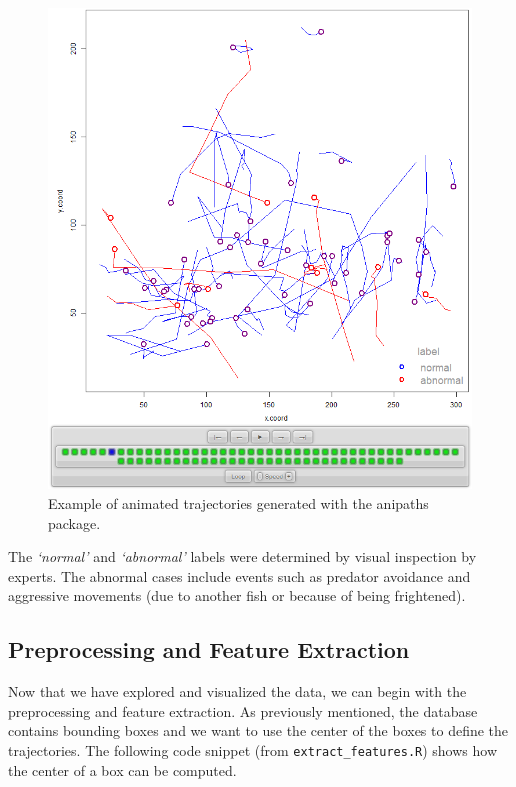 \documentclass[
  11pt,
]{krantz}
\begin{document}
\begin{figure}

{\centering \includegraphics[width=0.5\linewidth]{images/anim_trajectories} 

}

\caption{Example of animated trajectories generated with the anipaths package.}\label{fig:animTrajectories}
\end{figure}

The \emph{`normal'} and \emph{`abnormal'} labels were determined by visual inspection by experts. The abnormal cases include events such as predator avoidance and aggressive movements (due to another fish or because of being frightened).

\hypertarget{preprocessing-and-feature-extraction}{%
\subsection{Preprocessing and Feature Extraction}\label{preprocessing-and-feature-extraction}}

Now that we have explored and visualized the data, we can begin with the preprocessing and feature extraction. As previously mentioned, the database contains bounding boxes and we want to use the center of the boxes to define the trajectories. The following code snippet (from \texttt{extract\_features.R}) shows how the center of a box can be computed.
\end{document}
